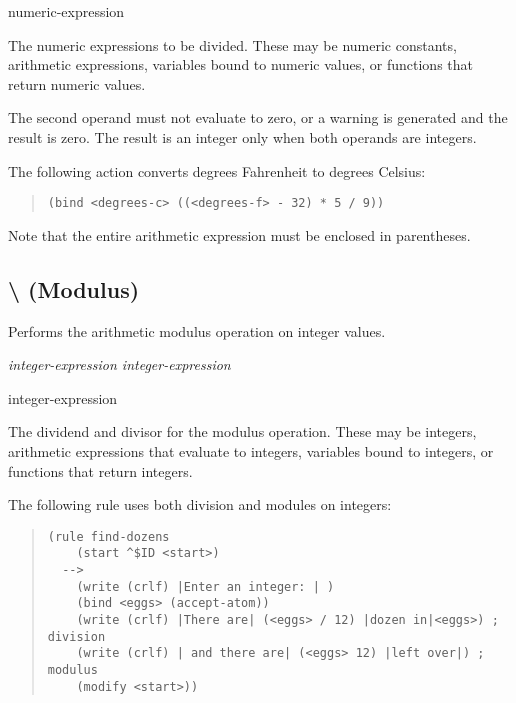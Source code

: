 \begin{operands}
\item[numeric-expression]

  The numeric expressions to be divided. These may be numeric
  constants, arithmetic expressions, variables bound to numeric
  values, or functions that return numeric values.

  The second operand must not evaluate to zero, or a warning is
  generated and the result is zero. The result is an integer only when
  both operands are integers.
\end{operands}

\Example 

The following action converts degrees Fahrenheit to degrees Celsius:

\begin{quote}
\begin{verbatim}
(bind <degrees-c> ((<degrees-f> - 32) * 5 / 9))
\end{verbatim}
\end{quote}

Note that the entire arithmetic expression must be enclosed in
parentheses.

\subsection{\co\textbackslash{} (Modulus)}

Performs the arithmetic modulus operation on integer values.

\Format

\it{integer-expression} \co{\textbackslash} \it{integer-expression}

\begin{operands}
\item[integer-expression]

  The dividend and divisor for the modulus operation. These may be
  integers, arithmetic expressions that evaluate to integers,
  variables bound to integers, or functions that return integers.
\end{operands}

\Example

The following rule uses both division and modules on integers:

\begin{quote}
\begin{verbatim}
(rule find-dozens
    (start ^$ID <start>)
  -->
    (write (crlf) |Enter an integer: | )
    (bind <eggs> (accept-atom))
    (write (crlf) |There are| (<eggs> / 12) |dozen in|<eggs>) ; division
    (write (crlf) | and there are| (<eggs> 12) |left over|) ; modulus
    (modify <start>))
\end{verbatim}
\end{quote}

